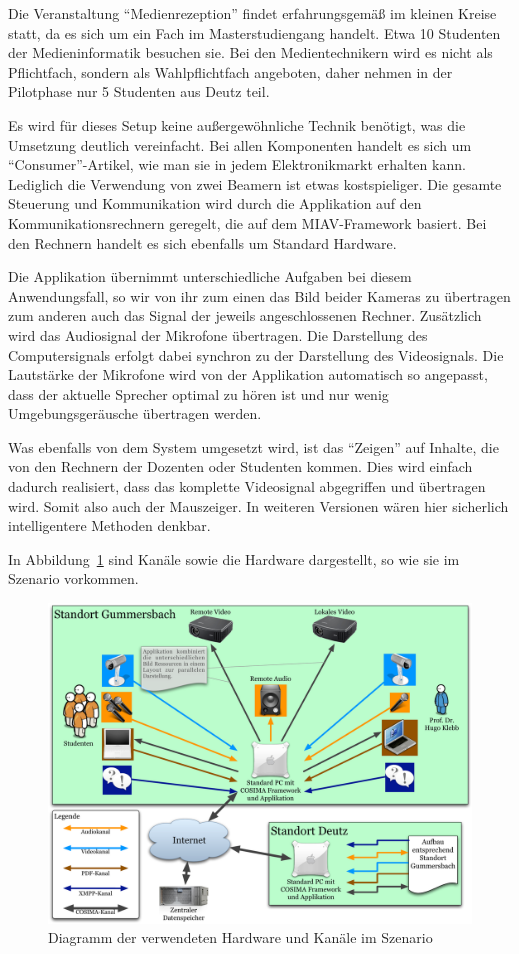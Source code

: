 Die Veranstaltung "`Medienrezeption"' findet erfahrungsgemäß im kleinen Kreise statt, da es sich um ein Fach im Masterstudiengang handelt. Etwa 10 Studenten der Medieninformatik besuchen sie. Bei den Medientechnikern wird es nicht als Pflichtfach, sondern als Wahlpflichtfach angeboten, daher nehmen in der Pilotphase nur 5 Studenten aus Deutz teil.

Es wird für dieses Setup keine außergewöhnliche Technik benötigt, was die Umsetzung deutlich vereinfacht. Bei allen Komponenten handelt es sich um "`Consumer"'-Artikel, wie man sie in jedem Elektronikmarkt erhalten kann. Lediglich die Verwendung von zwei Beamern ist etwas kostspieliger. Die gesamte Steuerung und Kommunikation wird durch die Applikation auf den Kommunikationsrechnern geregelt, die auf dem MIAV-Framework basiert. Bei den Rechnern handelt es sich ebenfalls um Standard Hardware.

Die Applikation übernimmt unterschiedliche Aufgaben bei diesem Anwendungsfall, so wir von ihr zum einen das Bild beider Kameras zu übertragen zum anderen auch das Signal der jeweils angeschlossenen Rechner. Zusätzlich wird das Audiosignal der Mikrofone übertragen. Die Darstellung des Computersignals erfolgt dabei synchron zu der Darstellung des Videosignals. Die Lautstärke der Mikrofone wird von der Applikation automatisch so angepasst, dass der aktuelle Sprecher optimal zu hören ist und nur wenig Umgebungsgeräusche übertragen werden.

Was ebenfalls von dem System umgesetzt wird, ist das "`Zeigen"' auf Inhalte, die von den Rechnern der Dozenten oder Studenten kommen. Dies wird einfach dadurch realisiert, dass das komplette Videosignal abgegriffen und übertragen wird. Somit also auch der Mauszeiger. In weiteren Versionen wären hier sicherlich intelligentere Methoden denkbar.

  In Abbildung~\ref{fig:images_Hardware_und_Kanaele} sind Kanäle sowie die Hardware dargestellt, so wie sie im Szenario vorkommen.

\begin{figure}[ht]
  \centering
    \includegraphics[width=.9\textwidth]{images/Hardware_und_Kanaele.pdf}
  \caption{Diagramm der verwendeten Hardware und Kanäle im Szenario}
  \label{fig:images_Hardware_und_Kanaele}
\end{figure}



